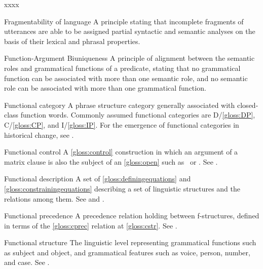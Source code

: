 \documentclass[output=paper,colorlinks,citecolor=brown]{langscibook}
\begin{document}
\begin{labeling}{xxxx}
\item[Fragmentability of language] A principle stating that incomplete fragments of utterances are able to be assigned partial syntactic and semantic analyses on the basis of their lexical and phrasal properties.

\item[Function-Argument Biuniqueness] A principle of alignment between the semantic roles and grammatical functions of a predicate, stating that no grammatical function can be associated with more than one semantic role, and no semantic role can be associated with more than one grammatical function.

\item[Functional category] A phrase structure category generally associated with closed-class function words.  Commonly assumed functional categories are D/\ref{gloss:DP}, C/\ref{gloss:CP}, and I/\ref{gloss:IP}.  For the emergence of functional categories in historical change, see \citetv[\ref{subsect:growth}]{chapters/Historical}.

\item[Functional control\namedlabel{gloss:fcontrol}{functional control}\namedlabel{gloss:fcontrolled}{functionally controlled}] A \ref{gloss:control} construction in which an argument of a matrix clause is also the subject of an \ref{gloss:open} such as \XCOMP\ or \XADJ.  See .  

\item[Functional description\namedlabel{gloss:Fdescr}{Functional description}\namedlabel{gloss:fdescr}{functional description}\namedlabel{gloss:fdescrs}{functional descriptions}] A set of \ref{gloss:definingequations} and \ref{gloss:constrainingequations} describing a set of linguistic structures and the relations among them.  See \citetv[\ref{sect:intro:definingequations}]{chapters/Intro} and \citetv[\ref{sec:CoreConcepts:Defining}]{chapters/CoreConcepts}.

\item[Functional precedence\namedlabel{gloss:Fprecedence}{Functional precedence}] A precedence relation holding between f-structures, defined in terms of the \ref{gloss:cprec} relation at \ref{gloss:cstr}.  See \citetv[\ref{sect:fprec}]{chapters/CoreConcepts}.

\item[Functional structure\namedlabel{gloss:Fstr}{Functional structure}\namedlabel{gloss:fstrs}{functional structures}\namedlabel{gloss:fstr}{functional structure}] The linguistic level representing grammatical functions such as subject and object, and grammatical features such as voice, person, number, and case.  See \citetv[\ref{sect:intro:fstr}]{chapters/Intro}.


\end{labeling}
\end{document}
